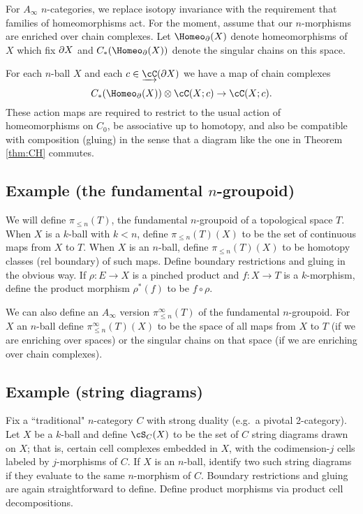 \documentclass{pnastwo}
\begin{document}
\begin{article}
\smallskip

For $A_\infty$ $n$-categories, we replace
isotopy invariance with the requirement that families of homeomorphisms act.
For the moment, assume that our $n$-morphisms are enriched over chain complexes.
Let $\Homeo_\bd(X)$ denote homeomorphisms of $X$ which fix $\partial X$ and
$C_*(\Homeo_\bd(X))$ denote the singular chains on this space.


\begin{axiom}
\label{axiom:families}
For each $n$-ball $X$ and each $c\in \cl{\cC}(\bd X)$ we have a map of chain complexes
\[
	C_*(\Homeo_\bd(X))\tensor \cC(X; c) \to \cC(X; c) .
\]
These action maps are required to restrict to the usual action of homeomorphisms on $C_0$, be associative up to homotopy,
and also be compatible with composition (gluing) in the sense that
a diagram like the one in Theorem \ref{thm:CH} commutes.
\end{axiom}

\subsection{Example (the fundamental $n$-groupoid)} \mbox{}
We will define $\pi_{\le n}(T)$, the fundamental $n$-groupoid of a topological space $T$.
When $X$ is a $k$-ball with $k<n$, define $\pi_{\le n}(T)(X)$
to be the set of continuous maps from $X$ to $T$.
When $X$ is an $n$-ball, define $\pi_{\le n}(T)(X)$ to be homotopy classes (rel boundary) of such maps.
Define boundary restrictions and gluing in the obvious way.
If $\rho:E\to X$ is a pinched product and $f:X\to T$ is a $k$-morphism,
define the product morphism $\rho^*(f)$ to be $f\circ\rho$.

We can also define an $A_\infty$ version $\pi_{\le n}^\infty(T)$ of the fundamental $n$-groupoid.
For $X$ an $n$-ball define $\pi_{\le n}^\infty(T)(X)$ to be the space of all maps from $X$ to $T$
(if we are enriching over spaces) or the singular chains on that space (if we are enriching over chain complexes).


\subsection{Example (string diagrams)} \mbox{}
Fix a ``traditional" $n$-category $C$ with strong duality (e.g.\ a pivotal 2-category).
Let $X$ be a $k$-ball and define $\cS_C(X)$ to be the set of $C$ string diagrams drawn on $X$;
that is, certain cell complexes embedded in $X$, with the codimension-$j$ cells labeled by $j$-morphisms of $C$.
If $X$ is an $n$-ball, identify two such string diagrams if they evaluate to the same $n$-morphism of $C$.
Boundary restrictions and gluing are again straightforward to define.
Define product morphisms via product cell decompositions.


\end{article}
\end{document}
